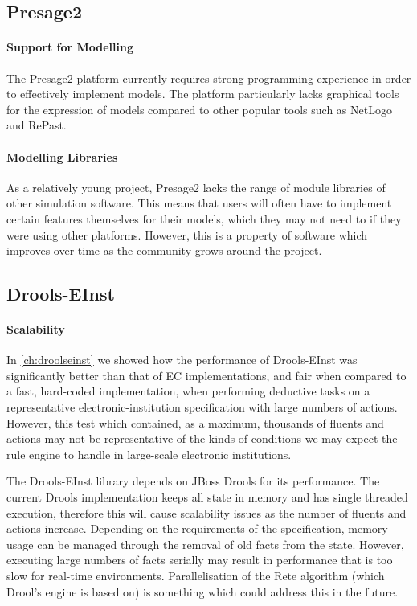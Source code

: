\subsection{Presage2}

\paragraph{Support for Modelling} The Presage2 platform currently requires
strong programming experience in order to effectively implement models. The
platform particularly lacks graphical tools for the expression of models
compared to other popular tools such as NetLogo and RePast.

\paragraph{Modelling Libraries} As a relatively young project, Presage2 lacks
the range of module libraries of other simulation software. This means that
users will often have to implement certain features themselves for their
models, which they may not need to if they were using other platforms.
However, this is a property of software which improves over time as the community
grows around the project.

\subsection{Drools-EInst}

\paragraph{Scalability}

In \autoref{ch:droolseinst} we showed how the performance of Drools-EInst was
significantly better than that of \ac{EC} implementations, and fair when
compared to a fast, hard-coded implementation, when performing deductive tasks
on a representative electronic-institution specification with large numbers of
actions. However, this test which contained, as a maximum, thousands of
fluents and actions may not be representative of the kinds of conditions we
may expect the rule engine to handle in large-scale electronic institutions.

The Drools-EInst library depends on JBoss Drools for its performance. The
current Drools implementation keeps all state in memory and has single
threaded execution, therefore this will cause scalability issues as the number
of fluents and actions increase. Depending on the requirements of the
specification, memory usage can be managed through the removal of old facts
from the state. However, executing large numbers of facts serially may result
in performance that is too slow for real-time environments. Parallelisation of
the Rete algorithm (which Drool's engine is based on) is something which could
address this in the future.

